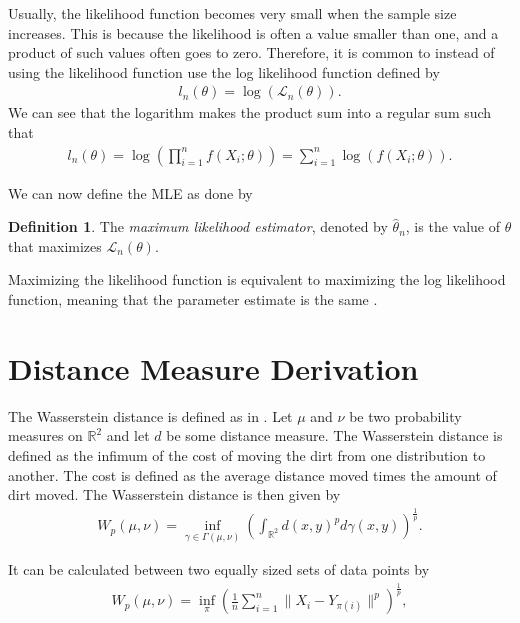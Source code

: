 \documentclass[%
a4paper,							
11pt,								
bibliography=totoc,						
abstracton=true					
]
{scrartcl}
\theoremstyle{plain}
\theoremstyle{definition}
\newtheorem{definition}[theorem]{Definition}
\theoremstyle{remark}
\newcommand{\1}{\mathbbm{1}}
\begin{document}
Usually, the likelihood function becomes very small when the sample size increases. This is because the likelihood is often a value smaller than one, and a product of such values often goes to zero. Therefore, it is common to instead of using the likelihood function use the log likelihood function defined by 
\begin{align*}
    l_n(\theta) = \log(\mathcal{L}_n(\theta)).
\end{align*}
We can see that the logarithm makes the product sum into a regular sum such that 
\begin{align*}
    l_n(\theta) = \log \left( \prod_{i=1}^n f(X_i;\theta) \right)= \sum_{i = 1}^n \log( f(X_i;\theta)).
\end{align*}

We can now define the \gls{MLE} as done by 
\begin{definition}
    The \emph{maximum likelihood estimator}, denoted by $\hat\theta_n$, is the value of $\theta$ that maximizes $\mathcal{L}_n(\theta)$.
\end{definition}
Maximizing the likelihood function is equivalent to maximizing the log likelihood function, meaning that the parameter estimate is the same . 



\section{Distance Measure Derivation}\label{sec:DistanceDerivation}
The Wasserstein distance is defined as in . Let $\mu$ and $\nu$ be two probability measures on $\mathbb{R}^2$ and let $d$ be some distance measure. The Wasserstein distance is defined as the infimum of the cost of moving the dirt from one distribution to another. The cost is defined as the average distance moved times the amount of dirt moved. The Wasserstein distance is then given by
\begin{align*}
    W_p(\mu,\nu) = \inf_{\gamma \in \Gamma(\mu,\nu)} \left( \int_{\mathbb{R}^2} d(x,y)^p d\gamma(x,y) \right)^{\frac{1}{p}}.
\end{align*}


It can be calculated between two equally sized sets of data points by
\begin{align*}
    W_p(\mu,\nu) =  \inf_{\pi} \left( \frac{1}{n} \sum_{i=1}^n \| X_i - Y_{\pi(i)}  \|^p \right)^{\frac{1}{p}},
\end{align*} 
\end{document}
